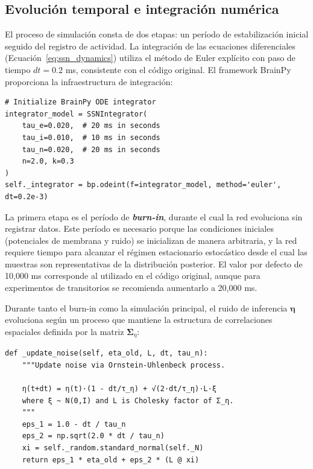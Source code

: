 \subsection{Evolución temporal e integración numérica}
\label{subsec:impl_evolucion}

El proceso de simulación consta de dos etapas: un período de estabilización inicial seguido del registro de actividad. La integración de las ecuaciones diferenciales (Ecuación~\ref{eq:ssn_dynamics}) utiliza el método de Euler explícito con paso de tiempo $dt = 0.2$ ms, consistente con el código original. El framework BrainPy proporciona la infraestructura de integración:

\begin{code}
\begin{verbatim}
# Initialize BrainPy ODE integrator
integrator_model = SSNIntegrator(
    tau_e=0.020,  # 20 ms in seconds
    tau_i=0.010,  # 10 ms in seconds
    tau_n=0.020,  # 20 ms in seconds
    n=2.0, k=0.3
)
self._integrator = bp.odeint(f=integrator_model, method='euler', dt=0.2e-3)
\end{verbatim}
\caption{Inicialización del integrador numérico con BrainPy.}
\label{code:brainpy_integrator}
\end{code}
\vspace{1.5em}

La primera etapa es el período de \textbf{\textit{burn-in}}, durante el cual la red evoluciona sin registrar datos. Este período es necesario porque las condiciones iniciales (potenciales de membrana y ruido) se inicializan de manera arbitraria, y la red requiere tiempo para alcanzar el régimen estacionario estocástico desde el cual las muestras son representativas de la distribución posterior. El valor por defecto de 10,000 ms corresponde al utilizado en el código original, aunque para experimentos de transitorios se recomienda aumentarlo a 20,000 ms.

Durante tanto el burn-in como la simulación principal, el ruido de inferencia $\boldsymbol{\eta}$ evoluciona según un proceso que mantiene la estructura de correlaciones espaciales definida por la matriz $\boldsymbol{\Sigma}_\eta$:

\begin{code}
\begin{verbatim}
def _update_noise(self, eta_old, L, dt, tau_n):
    """Update noise via Ornstein-Uhlenbeck process.
    
    η(t+dt) = η(t)·(1 - dt/τ_η) + √(2·dt/τ_η)·L·ξ
    where ξ ~ N(0,I) and L is Cholesky factor of Σ_η.
    """
    eps_1 = 1.0 - dt / tau_n
    eps_2 = np.sqrt(2.0 * dt / tau_n)
    xi = self._random.standard_normal(self._N)
    return eps_1 * eta_old + eps_2 * (L @ xi)
\end{verbatim}
\caption{Actualización del ruido correlacionado.}
\label{code:ou_noise}
\end{code}
\vspace{1.5em}

